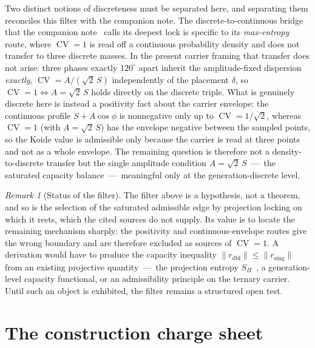 \documentclass[11pt]{article}
\theoremstyle{definition}
\theoremstyle{remark}
\newtheorem{remark}{Remark}
\newcommand{\CV}{\operatorname{CV}}
\newcommand{\SPi}{S_{\Pi}}
\begin{document}
    Two distinct notions of discreteness must be separated here, and separating them reconciles this filter with the
    companion note.
    The discrete-to-continuous bridge that the companion note~\cite{Beau2026kud} calls its deepest lock is specific
    to its \emph{max-entropy} route, where $\CV = 1$ is read off a continuous probability density and does not
    transfer to three discrete masses.
    In the present carrier framing that transfer does not arise: three phases exactly $120^\circ$ apart inherit the
    amplitude-fixed dispersion \emph{exactly}, $\CV = A/(\sqrt2\,S)$ independently of the placement $\delta$, so
    $\CV = 1 \iff A = \sqrt2\,S$ holds directly on the discrete triple.
    What is genuinely discrete here is instead a positivity fact about the carrier envelope: the continuous profile
    $S + A\cos\phi$ is nonnegative only up to $\CV = 1/\sqrt2$, whereas $\CV = 1$ (with $A = \sqrt2\,S$) has the
    envelope negative between the sampled points, so the Koide value is admissible only because the carrier is read
    at three points and not as a whole envelope.
    The remaining question is therefore not a density-to-discrete transfer but the single amplitude condition
    $A = \sqrt2\,S$~---~the saturated capacity balance~---~meaningful only at the generation-discrete level.

    \begin{remark}[Status of the filter]
      \label{rem:filter-status}
      The filter above is a hypothesis, not a theorem, and so is the selection of the saturated admissible edge by
      projection locking on which it rests, which the cited sources do not supply.
      Its value is to locate the remaining mechanism sharply: the positivity and continuous-envelope routes give the
      wrong boundary and are therefore excluded as sources of $\CV = 1$.
      A derivation would have to produce the capacity inequality
      $\lVert r_{\mathrm{dbl}} \rVert \le \lVert r_{\mathrm{sing}} \rVert$ from an existing projective
      quantity~---~the projection entropy $\SPi$~\cite{Beau2026l}, a generation-level capacity functional, or an
      admissibility principle on the ternary carrier.
      Until such an object is exhibited, the filter remains a structured open test.
    \end{remark}

  \section{The construction charge sheet}
    \label{sec:chargesheet}
\end{document}
